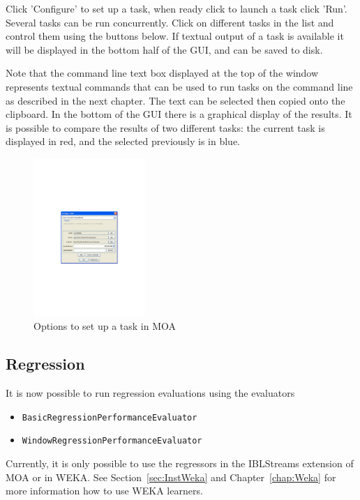 \documentclass[a4paper,12pt,twoside]{book}
\begin{document}
Click 'Configure' to set up a task, when ready click to launch a task click 'Run'. Several tasks can be run concurrently. Click on different tasks in the list and control them using the buttons below. If textual output of a task is available it will be displayed in the bottom half of the GUI, and can be saved to disk.

Note that the command line text box displayed at the top of the window represents textual commands that can be used to run tasks on the command line as described in the next chapter.
The text can be selected then copied onto the clipboard. 
In the bottom of the GUI there is a graphical display of the results. It is possible
to compare the results of two different tasks: the current task is displayed in red, and the selected previously is in blue. 

\begin{figure}[t]
\begin{center}
\includegraphics[height=6cm]{figures/Configure_Task}\end{center}
\caption{Options to set up a task in MOA}
\end{figure}

\subsection{Regression}

It is now possible to run regression evaluations using the evaluators
\begin{itemize}
\item {\tt BasicRegressionPerformanceEvaluator}  
\item {\tt WindowRegressionPerformanceEvaluator}
\end{itemize}
Currently, it is only possible to use the regressors in the IBLStreams extension of MOA or in WEKA.
See Section~\ref{sec:InstWeka} and Chapter~\ref{chap:Weka} for more information how to use WEKA learners. 
\end{document}
